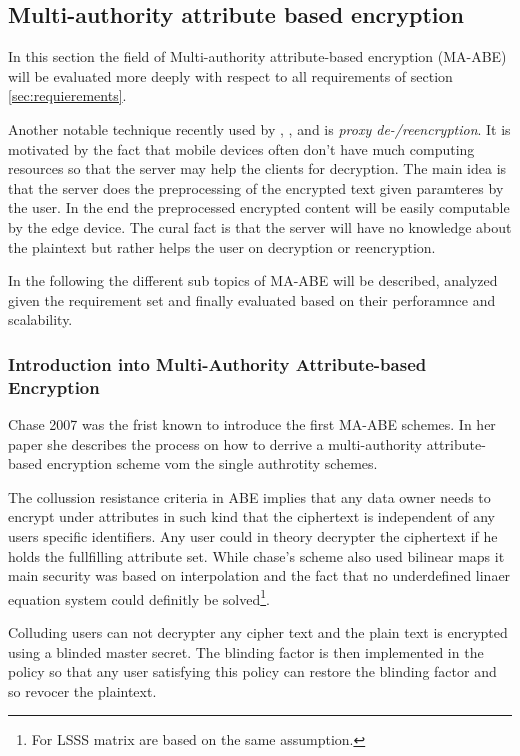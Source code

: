 \subsection{Multi-authority attribute based encryption}
In this section the field of Multi-authority attribute-based encryption (MA-ABE) will be evaluated more deeply with respect to all requirements of section \ref{sec:requierements}. 

Another notable technique recently used by \cite{yang2013dac}, \cite{wu2017security}, \cite{li2017two} and \cite{wang2011hierarchical} is \textit{proxy de-/reencryption}. It is motivated by the fact that mobile devices often don't have much computing resources so that the server may help the clients for decryption. The main idea is that the server does the preprocessing of the encrypted text given paramteres by the user. In the end the preprocessed encrypted content will be easily computable by the edge device. The cural fact is that the server will have no knowledge about the plaintext but rather helps the user on decryption or reencryption. 

In the following the different sub topics of MA-ABE will be described, analyzed given the requirement set and finally evaluated based on their perforamnce and scalability. 

\subsubsection{Introduction into Multi-Authority Attribute-based Encryption}
Chase 2007 \cite{chase2007multi} was the frist known to introduce the first MA-ABE schemes. In her paper she describes the process on how to derrive a multi-authority attribute-based encryption scheme vom the single authrotity schemes. 

The collussion resistance criteria in ABE implies that any data owner needs to encrypt under attributes in such kind that the ciphertext is independent of any users specific identifiers. Any user could in theory decrypter the ciphertext if he holds the fullfilling attribute set. While chase's scheme also used bilinear maps it main security was based on interpolation and the fact that no underdefined linaer equation system could definitly be solved\footnote{For LSSS matrix are based on the same assumption.}.  

Colluding users can not decrypter any cipher text and the plain text is encrypted using a blinded master secret. The blinding factor is then implemented in the policy so that any user satisfying this policy can restore the blinding factor and so revocer the plaintext. 

